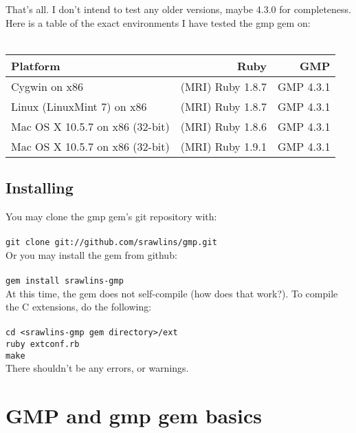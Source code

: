 \documentclass[pdftex,10pt]{article}
\begin{document}
That's all. I don't intend to test any older versions, maybe 4.3.0 for completeness.\\

Here is a table of the exact environments I have tested the gmp gem on:\\\\

\begin{tabular}{|l|r|r|} \hline
             Platform             &       Ruby       &    GMP    \\ \hline \hline
  Cygwin on x86                   & (MRI) Ruby 1.8.7 & GMP 4.3.1 \\ \hline
  Linux (LinuxMint 7) on x86      & (MRI) Ruby 1.8.7 & GMP 4.3.1 \\ \hline
  Mac OS X 10.5.7 on x86 (32-bit) & (MRI) Ruby 1.8.6 & GMP 4.3.1 \\ \hline
  Mac OS X 10.5.7 on x86 (32-bit) & (MRI) Ruby 1.9.1 & GMP 4.3.1 \\ \hline
\end{tabular}

\subsection{Installing}
You may clone the gmp gem's git repository with:\\
\\
\hangindent=0.5cm \texttt{git clone git://github.com/srawlins/gmp.git}\\

Or you may install the gem from github:\\
\\
\hangindent=0.5cm \texttt{gem install srawlins-gmp}\\

At this time, the gem does not self-compile (how does that work?). To compile the C
extensions, do the following:\\
\\
\hangindent=0.5cm \texttt{cd <srawlins-gmp gem directory>/ext}\\
\hangindent=0.5cm \texttt{ruby extconf.rb}\\
\hangindent=0.5cm \texttt{make}\\

There shouldn't be any errors, or warnings.

\section{GMP and gmp gem basics}
\end{document}

